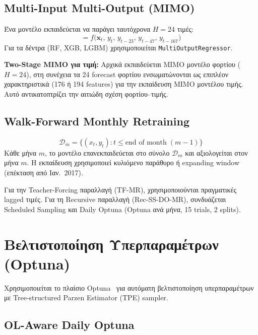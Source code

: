\subsection{Multi-Input Multi-Output (MIMO)}

Ένα μοντέλο εκπαιδεύεται να παράγει ταυτόχρονα $H=24$ τιμές:
\begin{equation}
    [\hat{y}_{t+1}, \hat{y}_{t+2}, \ldots, \hat{y}_{t+24}] = f\bigl(\mathbf{x}_t,\,
    y_t,\, y_{t-23},\, y_{t-47},\, y_{t-167}\bigr)
\end{equation}
Για τα δέντρα (RF, XGB, LGBM) χρησιμοποιείται \texttt{MultiOutputRegressor}.

\textbf{Two-Stage MIMO για τιμή:} Αρχικά εκπαιδεύεται MIMO μοντέλο φορτίου ($H=24$), στη
συνέχεια τα 24 forecast φορτίου ενσωματώνονται ως επιπλέον χαρακτηριστικά (176 ή 194 features)
για την εκπαίδευση MIMO μοντέλου τιμής. Αυτό αντικατοπτρίζει την αιτιώδη σχέση φορτίου--τιμής.

\subsection{Walk-Forward Monthly Retraining}

\begin{equation}
    \mathcal{D}_m = \{(x_t, y_t) : t \leq \text{end of month}\;(m-1)\}
\end{equation}
Κάθε μήνα $m$, το μοντέλο επανεκπαιδεύεται στο σύνολο $\mathcal{D}_m$ και αξιολογείται στον
μήνα $m$. Η εκπαίδευση χρησιμοποιεί κυλιόμενο παράθυρο ή expanding window (επέκταση από Ιαν.\ 2017).

Για την Teacher-Forcing παραλλαγή (TF-MR), χρησιμοποιούνται πραγματικές lagged τιμές.
Για τη Recursive παραλλαγή (Rec-SS-DO-MR), συνδυάζεται Scheduled Sampling και Daily Optuna
(Optuna ανά μήνα, 15 trials, 2 splits).


\section{Βελτιστοποίηση Υπερπαραμέτρων (Optuna)}
\label{sec:optuna}

Χρησιμοποιείται το πλαίσιο Optuna~\cite{optuna2019} για αυτόματη βελτιστοποίηση υπερπαραμέτρων
με Tree-structured Parzen Estimator (TPE) sampler.

\subsection{OL-Aware Daily Optuna}

